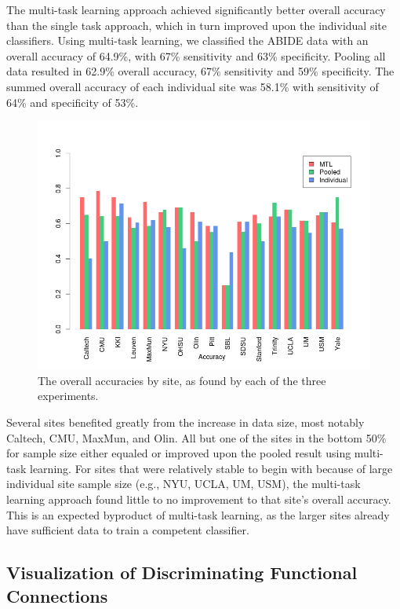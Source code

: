 \documentclass{llncs}
\begin{document}
The multi-task learning approach achieved significantly better overall accuracy than the single task approach, which in turn improved upon the individual site classifiers. Using multi-task learning, we classified the ABIDE data with an  overall accuracy of 64.9\%, with 67\% sensitivity and 63\% specificity.  Pooling all data resulted in 62.9\% overall accuracy, 67\% sensitivity and 59\% specificity. The summed overall accuracy of each individual site was 58.1\% with sensitivity of 64\% and specificity of 53\%.
\begin{figure}
	\centering
	\includegraphics[scale = .4]{acc_bar.png}
	\caption{The overall accuracies by site, as found by each of the three experiments. }
	\label{fig:acc_bar}
	\par\vspace{0pt}
\end{figure}


Several sites benefited greatly from the increase in data size, most notably
Caltech, CMU, MaxMun, and Olin.  All but one of the sites in the bottom 50\% for
sample size either equaled or improved upon the pooled result using multi-task learning.  For
sites that were relatively stable to begin with because of large individual site
sample size (e.g., NYU, UCLA, UM, USM), the multi-task learning approach found little to no
improvement to that site's overall accuracy. This is an expected byproduct of
multi-task learning, as the larger sites already have sufficient data to train
a competent classifier.

\subsection{Visualization of Discriminating Functional Connections}
\end{document}
